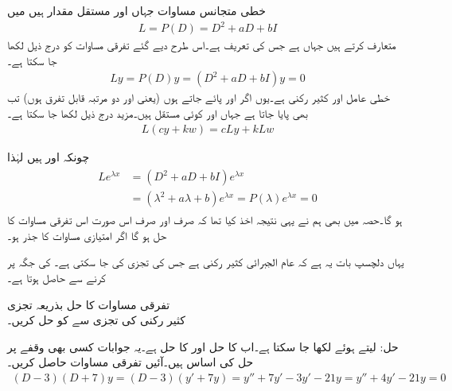 خطی متجانس مساوات  جہاں  اور  مستقل مقدار ہیں میں 
\begin{align*}
L=P(D)=D^2+aD+bI
\end{align*}
متعارف کرتے ہیں جہاں   ہے جس کی تعریف  ہے۔اس طرح دیے گئے تفرقی مساوات کو درج ذیل لکھا جا سکتا ہے۔
\begin{align}\label{مساوات_سادہ_دو_درجی_کثیر_رکنی_تفرقی_عامل_الف}
Ly=P(D)y=(D^2+aD+bI)y=0
\end{align}
 خطی عامل اور  کثیر رکنی ہے۔یوں اگر  اور  پائے جاتے ہوں (یعنی  اور  دو مرتبہ قابل تفرق ہوں) تب  بھی پایا جاتا ہے جہاں  اور  کوئی مستقل ہیں۔مزید درج ذیل لکھا جا سکتا ہے۔
\begin{align}
L(cy+kw)=cLy+kLw
\end{align}

چونکہ  اور  ہیں لہٰذا 
\begin{gather}
\begin{aligned}
Le^{\lambda x}&=(D^2+aD+bI)e^{\lambda x}\\
&=(\lambda^2+a\lambda+b)e^{\lambda x}=P(\lambda) e^{\lambda x}=0
\end{aligned}
\end{gather}
ہو گا۔حصہ  میں بھی ہم نے یہی نتیجہ اخذ کیا تھا کہ  صرف اور صرف اس صورت اس تفرقی مساوات کا حل ہو گا اگر  امتیازی مساوات  کا جذر ہو۔

یہاں دلچسپ بات یہ ہے کہ  عام الجبرائی کثیر رکنی ہے جس کی تجزی کی جا سکتی ہے۔ کی جگہ  پر کرنے سے   حاصل ہوتا ہے۔

\quad تفرقی مساوات کا حل بذریعہ تجزی\\
کثیر رکنی  کی تجزی سے  کو حل کریں۔

حل: لیتے ہوئے  لکھا جا سکتا ہے۔اب  کا حل  اور  کا حل  ہے۔یہ جوابات کسی بھی وقفے پر حل کی اساس ہیں۔آئیں تفرقی مساوات حاصل کریں۔
\begin{align*}
(D-3)(D+7)y=(D-3)(y'+7y)=y''+7y'-3y'-21y=y''+4y'-21y=0
\end{align*}

